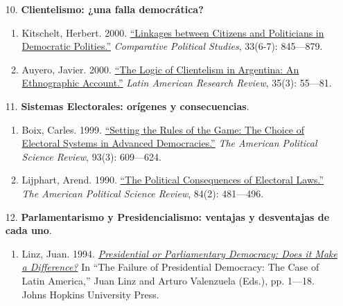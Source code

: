 \documentclass[letterpaper]{article}
\begin{document}
\begin{enumerate}
\begin{enumerate}
				\item[10.] {\bf Clientelismo: ¿una falla democr\'atica?} 
					\begin{enumerate}
						\item Kitschelt, Herbert. 2000. \href{https://github.com/hbahamonde/Ciencia_Politica_I/raw/master/Readings/Kitschelt.pdf}{``Linkages between Citizens and Politicians in Democratic Polities.''} \emph{Comparative Political Studies}, 33(6-7): 845---879.
					
						\item Auyero, Javier. 2000. \href{https://github.com/hbahamonde/Ciencia_Politica_I/raw/master/Readings/Auyero.pdf}{``The Logic of Clientelism in Argentina: An Ethnographic Account.''} \emph{Latin American Research Review}, 35(3): 55---81.
					\end{enumerate}
				
				\item[11.] {\bf Sistemas Electorales: or\'igenes y consecuencias}.
					\begin{enumerate}
						\item Boix, Carles. 1999. \href{https://github.com/hbahamonde/Ciencia_Politica_I/raw/master/Readings/Boix.pdf}{``Setting the Rules of the Game: The Choice of Electoral Systems in Advanced Democracies.''} \emph{The American Political Science Review}, 93(3): 609---624. 
						
						\item Lijphart, Arend. 1990. \href{https://github.com/hbahamonde/Ciencia_Politica_I/raw/master/Readings/Lijphart_1990.pdf}{``The Political Consequences of Electoral Laws.''} \emph{The American Political Science Review}, 84(2): 481---496.
					\end{enumerate}
				
				\item[12.] {\bf Parlamentarismo y Presidencialismo: ventajas y desventajas de cada uno}.
					\begin{enumerate}
						\item Linz, Juan. 1994. \href{https://github.com/hbahamonde/Ciencia_Politica_I/raw/master/Readings/Linz.pdf}{\emph{Presidential or Parliamentary Democracy: Does it Make a Difference?}} In ``The Failure of Presidential Democracy: The Case of Latin America,'' Juan Linz and Arturo Valenzuela (Eds.), pp. 1---18. Johns Hopkins University Press.%
						

\end{enumerate}
\end{enumerate}
\end{enumerate}
\end{document}
